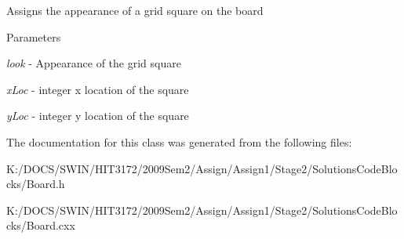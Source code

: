\label{class_board_a525f28458fc0a3ea79fdd69dfaa50192}
Assigns the appearance of a grid square on the board 
\begin{DoxyParams}{Parameters}
\item[{\em look}]-\/ Appearance of the grid square \item[{\em xLoc}]-\/ integer x location of the square \item[{\em yLoc}]-\/ integer y location of the square \end{DoxyParams}


The documentation for this class was generated from the following files:\begin{DoxyCompactItemize}
\item 
K:/DOCS/SWIN/HIT3172/2009Sem2/Assign/Assign1/Stage2/SolutionsCodeBlocks/Board.h\item 
K:/DOCS/SWIN/HIT3172/2009Sem2/Assign/Assign1/Stage2/SolutionsCodeBlocks/Board.cxx\end{DoxyCompactItemize}
